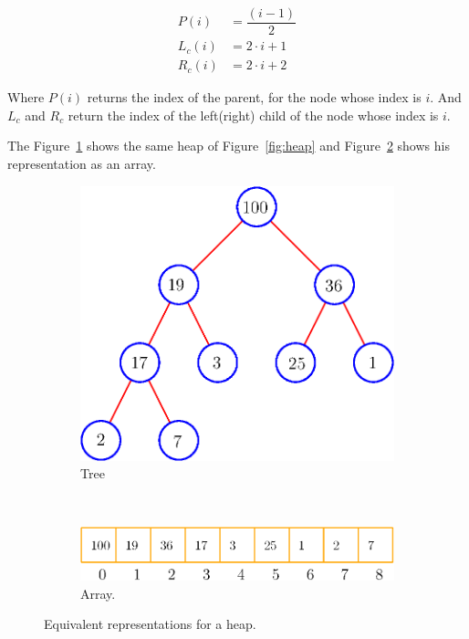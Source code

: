 \begin{align*}
P(i) & = \dfrac{(i - 1)}{2} \\
L_c(i) & = 2 \cdot i + 1 \\
R_c(i) & = 2 \cdot i + 2
\end{align*}

Where $P(i)$ returns the index of the parent, for the node whose index is $i$.
And $L_c$ and $R_c$ return the index of the left(right) child of the node whose index is $i$.

The Figure~\ref{fig:heaptree} shows the same heap of Figure~\ref{fig:heap} and Figure~\ref{fig:heaparray} shows his representation as an array.

\begin{figure}[htp]
\centering
 \begin{subfigure}[b]{0.3\textwidth}
   \includegraphics[width=\textwidth]{img/heapTree}
   \caption{Tree}
 \label{fig:heaptree}
 \end{subfigure}
~~
 \begin{subfigure}[b]{0.5\textwidth}
   \includegraphics[width=\textwidth]{img/heapArray}
   \caption{Array.}
   \label{fig:heaparray}
 \end{subfigure}
\caption{Equivalent representations for a heap.}
\label{fig:heapRep} 
\end{figure}

